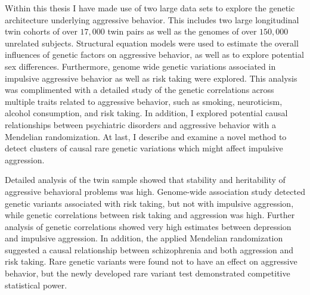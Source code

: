 \documentclass[header.tex]{subfiles}
\begin{document}
Within this thesis I have made use of two large data sets to explore the genetic architecture underlying aggressive behavior.
This includes two large longitudinal twin cohorts of over $17,000$ twin pairs as well as the genomes of over $150,000$ unrelated subjects. 
Structural equation models were used to estimate the overall influences of genetic factors on aggressive behavior, as well as to explore potential sex differences.
Furthermore, genome wide genetic variations associated in impulsive aggressive behavior as well as risk taking were explored.
This analysis was complimented with a detailed study of the genetic correlations across multiple traits related to aggressive behavior, such as smoking, neuroticism, alcohol consumption, and risk taking.    
In addition, I explored potential causal relationships between psychiatric disorders and aggressive behavior with a Mendelian randomization. 
At last, I describe and examine a novel method to detect clusters of causal rare genetic variations which might affect impulsive aggression. 

Detailed analysis of the twin sample showed that stability and heritability of aggressive behavioral problems was high.
Genome-wide association study detected genetic variants associated with risk taking, but not with impulsive aggression, while genetic correlations between risk taking and aggression was high.
Further analysis of genetic correlations showed very high estimates between depression and impulsive aggression.
In addition, the applied Mendelian randomization suggested a causal relationship between schizophrenia and both aggression and risk taking.
Rare genetic variants were found not to have an effect on aggressive behavior, but the newly developed rare variant test demonstrated competitive statistical power.
\end{document}
